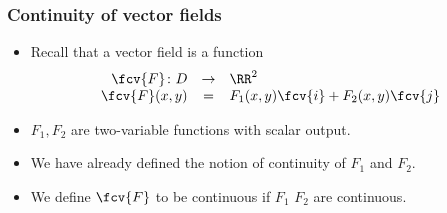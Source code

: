 \begin{frame}
  \frametitle{Continuity of vector fields}
\begin{itemize}
\item Recall that a vector field is a function 
\[
\begin{array}{rcl}
\fcv{F}\colon D &\to& \RR^2 \\ 
\fcv{F}(x,y) &=& F_1(x,y) \fcv{i} + F_2(x,y) \fcv{j} 
\end{array}
\]
\item<2-> $F_1, F_2$ are two-variable functions with scalar output.
\item<3-> We have already defined the notion of continuity of $F_1$ and $F_2$.
\item<4-> We define $\fcv{F}$ to be continuous if $ F_1$ $F_2$ are continuous.
\end{itemize}

\end{frame}